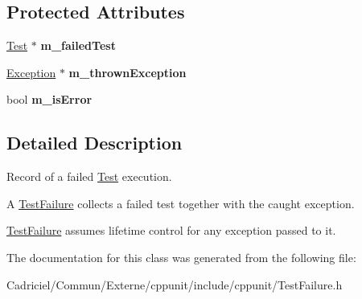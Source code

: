 \subsection*{Protected Attributes}
\begin{DoxyCompactItemize}
\item 
\hypertarget{class_test_failure_a2ba79089909967b45aedc4992b51553a}{\hyperlink{class_test}{Test} $\ast$ {\bfseries m\-\_\-failed\-Test}}\label{class_test_failure_a2ba79089909967b45aedc4992b51553a}

\item 
\hypertarget{class_test_failure_a96bfae3c1f32d0c1729501d68016f431}{\hyperlink{class_exception}{Exception} $\ast$ {\bfseries m\-\_\-thrown\-Exception}}\label{class_test_failure_a96bfae3c1f32d0c1729501d68016f431}

\item 
\hypertarget{class_test_failure_abf258e5bec289b51fb13147a62b8b75d}{bool {\bfseries m\-\_\-is\-Error}}\label{class_test_failure_abf258e5bec289b51fb13147a62b8b75d}

\end{DoxyCompactItemize}


\subsection{Detailed Description}
Record of a failed \hyperlink{class_test}{Test} execution.

A \hyperlink{class_test_failure}{Test\-Failure} collects a failed test together with the caught exception. 

\hyperlink{class_test_failure}{Test\-Failure} assumes lifetime control for any exception passed to it. 

The documentation for this class was generated from the following file\-:\begin{DoxyCompactItemize}
\item 
Cadriciel/\-Commun/\-Externe/cppunit/include/cppunit/Test\-Failure.\-h\end{DoxyCompactItemize}
